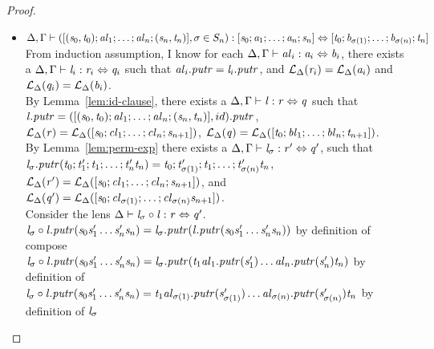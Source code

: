 \begin{lemma}
\begin{proof}
\begin{itemize}
\item$\Delta, \Gamma \vdash ([(\mathit{s}_0,\mathit{t}_0);\mathit{al}_1;\ldots;\mathit{al}_n;(\mathit{s}_n,\mathit{t}_n)],\sigma \in S_n) : [\mathit{s}_0 ; \mathit{a}_1 ; \ldots ; \mathit{a}_n ; \mathit{s}_n] \Leftrightarrow [\mathit{t}_0; \mathit{b}_{\sigma(1)} ; \ldots ; \mathit{b}_{\sigma(n)} ; \mathit{t}_n]$\\
From induction assumption, I know for each $\Delta, \Gamma \vdash \mathit{al}_i : \mathit{a}_i \Leftrightarrow \mathit{b}_i$, there exists a $\Delta, \Gamma \vdash \mathit{l}_i : \mathit{r}_i \Leftrightarrow \mathit{q}_i$ such that $\mathit{al}_i\mathit{.putr}=\mathit{l}_i\mathit{.putr}$,
and $\mathcal{L}_{\Delta}(\mathit{r}_i)=\mathcal{L}_{\Delta}(\mathit{a}_i)$ and $\mathcal{L}_{\Delta}(\mathit{q}_i)=\mathcal{L}_{\Delta}(\mathit{b}_i)$.\\
By Lemma~\ref{lem:id-clause}, there exists a $\Delta, \Gamma \vdash \mathit{l} : \mathit{r} \Leftrightarrow \mathit{q}$ such that $\mathit{l}\mathit{.putr}=([(\mathit{s}_0,\mathit{t}_0);\mathit{al}_1;\ldots;\mathit{al}_n;(\mathit{s}_n,\mathit{t}_n)],id)\mathit{.putr}$,
$\mathcal{L}_{\Delta}(\mathit{r})=\mathcal{L}_{\Delta}([\mathit{s}_0;\mathit{cl}_1;\ldots;\mathit{cl}_n;\mathit{s}_{n+1}])$,
$\mathcal{L}_{\Delta}(\mathit{q})=\mathcal{L}_{\Delta}([\mathit{t}_0;\mathit{bl}_1;\ldots;\mathit{bl}_n;\mathit{t}_{n+1}])$.\\
By Lemma~\ref{lem:perm-exp} there exists a $\Delta, \Gamma \vdash \mathit{l}_{\sigma} : \mathit{r}' \Leftrightarrow \mathit{q}'$,
such that $\mathit{l}_{\sigma}\mathit{.putr}(\mathit{t}_0;\mathit{t}_1';\mathit{t}_1;\ldots;\mathit{t}_n'\mathit{t}_n)=\mathit{t}_0;\mathit{t}_{\sigma(1)}';\mathit{t}_1;\ldots;\mathit{t}_{\sigma(n)}'\mathit{t}_n$,
$\mathcal{L}_{\Delta}(\mathit{r}')=\mathcal{L}_{\Delta}([\mathit{s}_0;\mathit{cl}_1;\ldots;\mathit{cl}_n;\mathit{s}_{n+1}])$, and
$\mathcal{L}_{\Delta}(\mathit{q}')=\mathcal{L}_{\Delta}([\mathit{s}_0;\mathit{cl}_{\sigma(1)};\ldots;\mathit{cl}_{\sigma(n)}\mathit{s}_{n+1}])$.\\
Consider the lens $\Delta \vdash \mathit{l}_{\sigma} \circ \mathit{l} : \mathit{r} \Leftrightarrow \mathit{q}'$.\\
$\mathit{l}_{\sigma} \circ \mathit{l}\mathit{.putr}(\mathit{s}_0\mathit{s}_1'\ldots\mathit{s}_n'\mathit{s}_n)=\mathit{l}_{\sigma}\mathit{.putr}(\mathit{l}\mathit{.putr}(\mathit{s}_0\mathit{s}_1'\ldots\mathit{s}_n'\mathit{s}_n))$ by definition of compose\\
$\mathit{l}_{\sigma} \circ \mathit{l}\mathit{.putr}(\mathit{s}_0\mathit{s}_1'\ldots\mathit{s}_n'\mathit{s}_n)=\mathit{l}_{\sigma}\mathit{.putr}(\mathit{t}_1\mathit{al}_1\mathit{.putr}(\mathit{s}_1')\ldots\mathit{al}_n\mathit{.putr}(\mathit{s}_n')\mathit{t}_n)$ by definition of \Lens{}\\
$\mathit{l}_{\sigma} \circ \mathit{l}\mathit{.putr}(\mathit{s}_0\mathit{s}_1'\ldots\mathit{s}_n'\mathit{s}_n)=\mathit{t}_1\mathit{al}_{\sigma(1)}\mathit{.putr}(\mathit{s}_{\sigma(1)}')\ldots\mathit{al}_{\sigma(n)}\mathit{.putr}(\mathit{s}_{\sigma(n)}')\mathit{t}_n$ by definition of $\mathit{l}_{\sigma}$\\

\end{itemize}
\end{proof}
\end{lemma}
